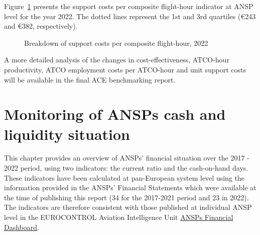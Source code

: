 \documentclass[
  letterpaper,
  DIV=11,
  numbers=noendperiod]{scrreprt}
\begin{document}
\newpage{}

Figure~\ref{fig-figure-4-7} presents the support costs per composite
flight-hour indicator at ANSP level for the year 2022. The dotted lines
represent the 1st and 3rd quartiles (€243 and €382, respectively).

\hfill\break

\begin{figure}[h]


\caption{\label{fig-figure-4-7}Breakdown of support costs per composite
flight-hour, 2022}

\end{figure}%

A more detailed analysis of the changes in cost-effectiveness, ATCO-hour
productivity, ATCO employment costs per ATCO-hour and unit support costs
will be available in the final ACE benchmarking report.


\chapter{Monitoring of ANSPs cash and liquidity
situation}\label{sec-covid}

This chapter provides an overview of ANSPs' financial situation over the
2017 - 2022 period, using two indicators: the current ratio and the
cash-on-hand days. These indicators have been calculated at pan-European
system level using the information provided in the ANSPs' Financial
Statements which were available at the time of publishing this report
(34 for the 2017-2021 period and 23 in 2022). The indicators are
therefore consistent with those published at individual ANSP level in
the EUROCONTROL Aviation Intelligence Unit
\href{https://ansperformance.eu/economics/finance/}{ANSPs Financial
Dashboard}.
\end{document}
